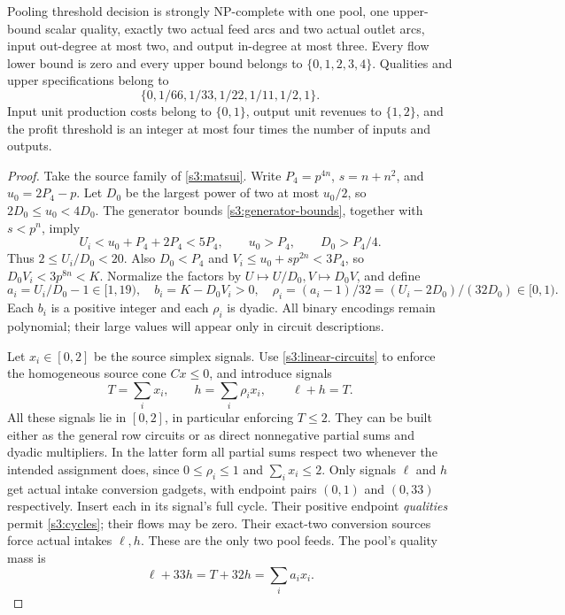 \begin{theorem}\label{s3:constant-thm}
Pooling threshold decision is strongly NP-complete with one pool, one
upper-bound scalar quality, exactly two actual feed arcs and two actual
outlet arcs, input out-degree at most two, and output in-degree at most
three. Every flow lower bound is zero and every upper bound belongs to
$\{0,1,2,3,4\}$. Qualities and upper specifications belong to
\begin{equation}
 \{0,1/66,1/33,1/22,1/11,1/2,1\}.\label{s3:palette}
\end{equation}
Input unit production costs belong to $\{0,1\}$, output unit revenues
to $\{1,2\}$, and the profit threshold is an integer at most four times
the number of inputs and outputs.
\end{theorem}
\begin{proof}
Take the source family of \cref{s3:matsui}. Write $P_4=p^{4n}$,
$s=n+n^2$, and $u_0=2P_4-p$. Let $D_0$ be the largest power of two
at most $u_0/2$, so $2D_0\le u_0<4D_0$. The generator bounds
\eqref{s3:generator-bounds}, together with $s<p^n$, imply
\[
 U_i<u_0+P_4+2P_4<5P_4,\qquad
 u_0>P_4,\qquad D_0>P_4/4.
\]
Thus $2\le U_i/D_0<20$. Also $D_0<P_4$ and
$V_i\le u_0+sp^{2n}<3P_4$, so $D_0V_i<3p^{8n}<K$.
Normalize the factors by $U\mapsto U/D_0,V\mapsto D_0V$, and define
\begin{equation}
 a_i=U_i/D_0-1\in[1,19),\quad b_i=K-D_0V_i>0,
 \quad \rho_i=(a_i-1)/32=(U_i-2D_0)/(32D_0)\in[0,1).
 \label{s3:dyadic-data}
\end{equation}
Each $b_i$ is a positive integer and each $\rho_i$ is dyadic. All
binary encodings remain polynomial; their large values will appear
only in circuit descriptions.

Let $x_i\in[0,2]$ be the source simplex signals. Use
\cref{s3:linear-circuits} to enforce the homogeneous source cone
$Cx\le0$, and introduce signals
\begin{equation}
 T=\sum_i x_i,\qquad h=\sum_i\rho_ix_i,\qquad \ell+h=T.
 \label{s3:two-feeds}
\end{equation}
All these signals lie in $[0,2]$, in particular enforcing $T\le2$.
They can be built either as the general row circuits or as direct
nonnegative partial sums and dyadic multipliers. In the latter form all
partial sums respect two whenever the intended assignment does, since
$0\le\rho_i\le1$ and $\sum_i x_i\le2$.
Only signals $\ell$ and $h$ get actual intake conversion gadgets, with
endpoint pairs $(0,1)$ and $(0,33)$ respectively. Insert each in its
signal's full cycle. Their positive endpoint \emph{qualities} permit
\cref{s3:cycles}; their flows may be zero. Their exact-two conversion
sources force actual intakes $\ell,h$. These are the only two pool feeds.
The pool's quality mass is
\begin{equation}
 \ell+33h=T+32h=\sum_i a_ix_i.\label{s3:mass-two-feeds}
\end{equation}


\end{proof}
